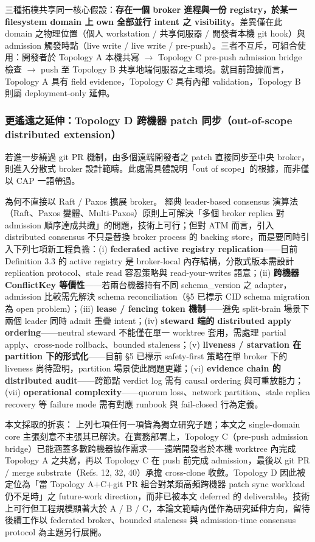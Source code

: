 \documentclass[a4paper,fontset=none]{ctexart}
\begin{document}
三種拓樸共享同一核心假設：\textbf{存在一個 broker 進程與一份 registry，於某一 filesystem domain 上 own 全部並行 intent 之 visibility}。差異僅在此 domain 之物理位置（個人 workstation / 共享伺服器 / 開發者本機 git hook）與 admission 觸發時點（live write / live write / pre-push）。三者不互斥，可組合使用：開發者於 Topology A 本機共寫 $\rightarrow$ Topology C pre-push admission bridge 檢查 $\rightarrow$ push 至 Topology B 共享地端伺服器之主環境。就目前證據而言，Topology A 具有 field evidence，Topology C 具有內部 validation，Topology B 則屬 deployment-only 延伸。

\subsubsection*{更遙遠之延伸：Topology D 跨機器 patch 同步（out-of-scope distributed extension）}

若進一步繞過 git PR 機制，由多個遠端開發者之 patch 直接同步至中央 broker，則進入分散式 broker 設計範疇。此處需具體說明「out of scope」的根據，而非僅以 CAP 一語帶過。

為何不直接以 Raft / Paxos 擴展 broker。 經典 leader-based consensus 演算法（Raft、Paxos 變體、Multi-Paxos）原則上可解決「多個 broker replica 對 admission 順序達成共識」的問題，技術上可行；但對 ATM 而言，引入 distributed consensus 不只是替換 broker process 的 backing store，而是要同時引入下列七項新工程負擔：(i) \textbf{federated active registry replication}------目前 Definition 3.3 的 active registry 是 broker-local 內存結構，分散式版本需設計 replication protocol、stale read 容忍策略與 read-your-writes 語意；(ii) \textbf{跨機器 ConflictKey 等價性}------若兩台機器持有不同 schema\_version 之 adapter，admission 比較需先解決 schema reconciliation（§5 已標示 CID schema migration 為 open problem）；(iii) \textbf{lease / fencing token 機制}------避免 split-brain 場景下兩個 leader 同時 admit 重疊 intent；(iv) \textbf{steward 端的 distributed apply ordering}------neutral steward 不能僅在單一 worktree 套用，需處理 partial apply、cross-node rollback、bounded staleness；(v) \textbf{liveness / starvation 在 partition 下的形式化}------目前 §5 已標示 safety-first 策略在單 broker 下的 liveness 尚待證明，partition 場景使此問題更難；(vi) \textbf{evidence chain 的 distributed audit}------跨節點 verdict log 需有 causal ordering 與可重放能力；(vii) \textbf{operational complexity}------quorum loss、network partition、stale replica recovery 等 failure mode 需有對應 runbook 與 fail-closed 行為定義。

本文採取的折衷： 上列七項任何一項皆為獨立研究子題；本文之 single-domain core 主張刻意不主張其已解決。在實務部署上，Topology C（pre-push admission bridge）已能涵蓋多數跨機器協作需求------遠端開發者於本機 worktree 內完成 Topology A 之共寫，再以 Topology C 在 push 前完成 admission，最後以 git PR / merge substrate（Refs. 12, 32, 40）承擔 cross-clone 收斂。Topology D 因此被定位為「當 Topology A+C+git PR 組合對某類高頻跨機器 patch sync workload 仍不足時」之 future-work direction，而非已被本文 deferred 的 deliverable。技術上可行但工程規模顯著大於 A / B / C，本論文範疇內僅作為研究延伸方向，留待後續工作以 federated broker、bounded staleness 與 admission-time consensus protocol 為主題另行展開。
\end{document}
